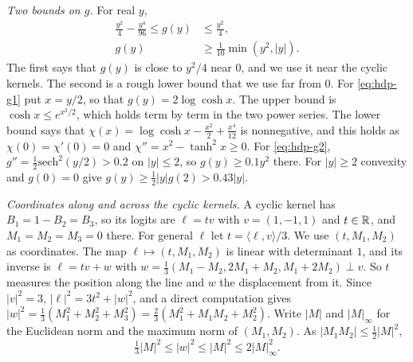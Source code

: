\emph{Two bounds on $g$.} For real $y$,
\begin{align}
 \frac{y^2}4-\frac{y^4}{96}\le g(y)&\le\frac{y^2}4,\tag{g1}\label{eq:hdp-g1}\\
 g(y)&\ge\frac1{10}\min(y^2,|y|).\tag{g2}\label{eq:hdp-g2}
\end{align}
The first says that $g(y)$ is close to $y^2/4$ near $0$, and we use it near
the cyclic kernels. The second is a rough lower bound that we use far from
$0$. For \eqref{eq:hdp-g1} put $x=y/2$, so that $g(y)=2\log\cosh x$. The upper
bound is $\cosh x\le e^{x^2/2}$, which holds term by term in the two power
series. The lower bound says that
$\chi(x)=\log\cosh x-\frac{x^2}2+\frac{x^4}{12}$ is nonnegative, and this holds
as $\chi(0)=\chi'(0)=0$ and $\chi''=x^2-\tanh^2x\ge0$. For \eqref{eq:hdp-g2},
$g''=\frac12\mathrm{sech}^2(y/2)>0.2$ on $|y|\le2$, so $g(y)\ge0.1y^2$ there.
For $|y|\ge2$ convexity and $g(0)=0$ give $g(y)\ge\frac12|y|g(2)>0.43|y|$.

\emph{Coordinates along and across the cyclic kernels.} A cyclic kernel has
$B_1=1-B_2=B_3$, so its logits are $\ell=tv$ with $v=(1,-1,1)$ and $t\in\mathbb R$,
and $M_1=M_2=M_3=0$ there. For general $\ell$ let $t=\langle\ell,v\rangle/3$.
We use $(t,M_1,M_2)$ as coordinates. The map $\ell\mapsto(t,M_1,M_2)$ is
linear with determinant $1$, and its inverse is $\ell=tv+w$ with
$w=\frac13(M_1-M_2,2M_1+M_2,M_1+2M_2)\perp v$. So $t$ measures the position
along the line and $w$ the displacement from it. Since $|v|^2=3$,
$|\ell|^2=3t^2+|w|^2$, and a direct computation gives
$|w|^2=\frac13(M_1^2+M_2^2+M_3^2)=\frac23(M_1^2+M_1M_2+M_2^2)$. Write $|M|$
and $|M|_\infty$ for the Euclidean norm and the maximum norm of $(M_1,M_2)$.
As $\lvert M_1M_2\rvert\le\frac12|M|^2$,
\begin{equation}\label{eq:hdp-w}
 \tfrac13|M|^2\le|w|^2\le|M|^2\le2|M|_\infty^2.
\end{equation}


